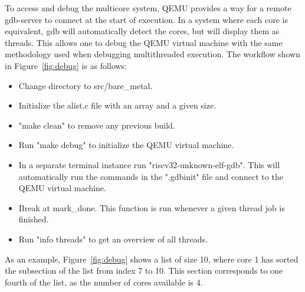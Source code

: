 To access and debug the multicore system, QEMU provides a way for a remote
gdb-server to connect at the start of execution\cite{QEMU}. In a system where
each core is equivalent, gdb will automatically detect the cores, but will
display them as threads. This allows one to debug the QEMU virtual machine with
the same methodology used when debugging multithreaded execution. The workflow
shown in Figure~\ref{fig:debug} is as follows:
\begin{itemize}
\item Change directory to src/bare\_metal.
\item Initialize the alist.c file with an array and a given size.
\item "make clean" to remove any previous build.
\item Run "make debug" to initialize the QEMU virtual machine.
\item In a separate terminal instance run "riscv32-unknown-elf-gdb". This will
  automatically run the commands in the ".gdbinit" file and connect to the QEMU
  virtual machine.
\item Break at mark\_done. This function is run whenever a given thread job is
  finished.
\item Run "info threads" to get an overview of all threads.
\end{itemize}
As an example, Figure~\ref{fig:debug} shows a list of size 10, where core 1 has
sorted the subsection of the list from index 7 to 10. This section corresponds
to one fourth of the list, as the number of cores available is 4.

